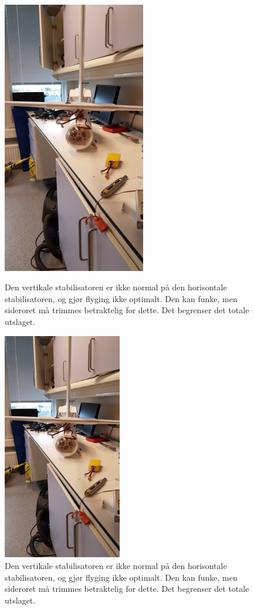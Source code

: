 \documentclass[12pt, a4paper]{article}
\begin{document}
\begin{figure}[ht]
	\includegraphics[width = .6\textwidth, height = 12cm]{bilder/skjev_halefinne.jpg}
	\caption{Den vertikale stabilisatoren er ikke normal på den horisontale stabilisatoren, og gjør flyging ikke optimalt. Den kan funke, men sideroret må trimmes betraktelig for dette. Det begrenser det totale utslaget.}

	\includegraphics[width = .5\textwidth, height = 10cm]{bilder/skjev_halefinne.jpg}
	\caption[Skjev stabilisator]{Den vertikale stabilisatoren er ikke normal på den horisontale stabilisatoren, og gjør flyging ikke optimalt. Den kan funke, men sideroret må trimmes betraktelig for dette. Det begrenser det totale utslaget.}

\end{figure}
\end{document}
